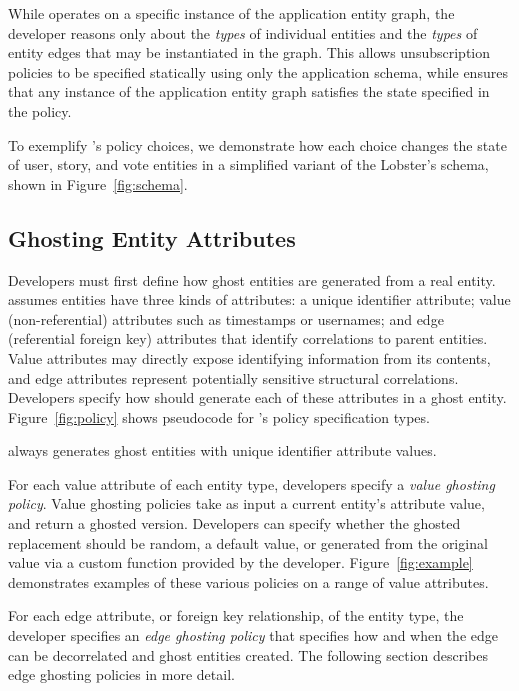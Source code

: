 While \sys operates on a specific instance of the application entity graph, the developer reasons
only about the \emph{types} of individual entities and the \emph{types} of entity edges that may be
instantiated in the graph. This allows unsubscription policies to be specified statically using only
the application schema, while \sys ensures that any instance of the application entity graph
satisfies the state specified in the policy.

To exemplify \sys's policy choices, we demonstrate how each choice changes the state of user, story,
and vote entities in a simplified variant of the Lobster's schema, shown in Figure~\ref{fig:schema}.

\subsection{Ghosting Entity Attributes}
\label{sec:ghosting}
Developers must first define how ghost entities are generated from a real entity.
\sys assumes entities have three kinds of attributes: a unique identifier attribute; 
value (non-referential) attributes such as timestamps or usernames; and 
edge (referential foreign key) attributes that identify correlations to parent entities. 
Value attributes may directly expose identifying information from its
contents, and edge attributes represent potentially sensitive structural correlations. 
Developers specify how \sys should generate each of these attributes in a ghost entity.
Figure~\ref{fig:policy} shows pseudocode for \sys's policy specification types.

\sys always generates ghost entities with unique identifier attribute values.

For each value attribute of each entity type, developers specify a \emph{value ghosting policy}.
Value ghosting policies take as input a current entity's attribute value, and return a ghosted
version. Developers can specify whether the ghosted replacement should be random, a default value,
or generated from the original value via a custom function provided by the developer.
Figure~\ref{fig:example} demonstrates examples of these various policies on a range of
value attributes.

For each edge attribute, or foreign key relationship, of the entity type, the developer specifies an
\emph{edge ghosting policy} that specifies how and when the edge can be decorrelated and ghost
entities created.  The following section describes edge ghosting policies in more detail.


